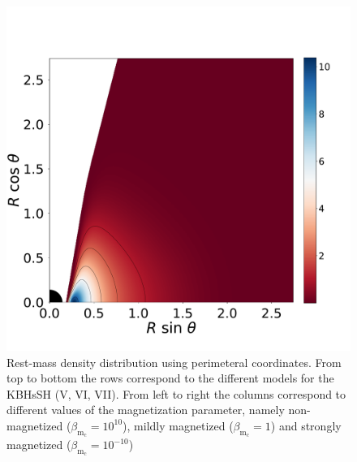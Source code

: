 \documentclass[twocolumn,aps,showpacs,showkeys,prd,superscriptaddress,byrevtex, amsmath]{revtex4-1}
\begin{document}
\begin{figure}
\hspace{-0.2cm}
\includegraphics[scale=0.14]{figures/fig4_VII__10.pdf}
\hspace{-0.2cm}
\caption{Rest-mass density distribution using perimeteral coordinates. From top to bottom the rows correspond to the different models for the KBHsSH (V, VI, VII). From left to right the columns correspond to different values of the magnetization parameter, namely non-magnetized ($\beta_{\mathrm{m}_{\mathrm{c}}} = 10^{10}$), mildly magnetized ($\beta_{\mathrm{m}_{\mathrm{c}}} = 1$) and strongly magnetized ($\beta_{\mathrm{m}_{\mathrm{c}}} = 10^{-10}$)}
\label{models_peri_II}
\end{figure}
\end{document}

